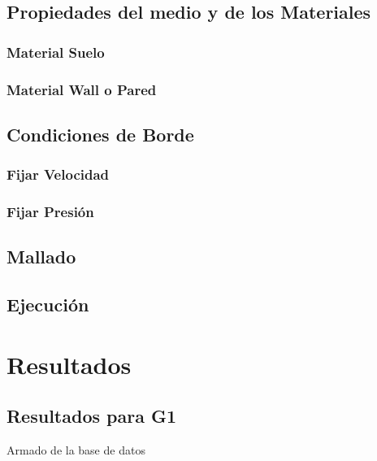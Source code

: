 \documentclass[spanish]{beamer}
\begin{document}
\subsection{Propiedades del medio y de los Materiales}
\subsubsection{Material Suelo}
\subsubsection{Material Wall o Pared}
\subsection{Condiciones de Borde}
\subsubsection{Fijar Velocidad}
\subsubsection{Fijar Presión}
\subsection{Mallado}
\subsection{Ejecución}
\section{Resultados}
%
\subsection{Resultados para G1}
\begin{frame}{Armado de la base de datos}
\end{frame}
\end{document}
